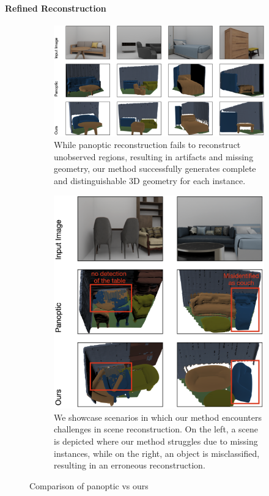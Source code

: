 \paragraph{Refined Reconstruction}

\begin{figure}%
  \begin{subfigure}[t]{109mm}
    \includegraphics[width=\linewidth]{images/image1.png}
    \caption{While panoptic reconstruction fails to reconstruct unobserved regions, resulting in artifacts and missing geometry, our method successfully generates complete and distinguishable 3D geometry for each instance.}\label{fig:comparison_good}
  \end{subfigure}
  \qquad
  \begin{subfigure}[t]{56mm}
    \includegraphics[width=\linewidth]{images/image2.png}
    \caption{We showcase scenarios in which our method encounters challenges in scene reconstruction. On the left, a scene is depicted where our method struggles due to missing instances, while on the right, an object is misclassified, resulting in an erroneous reconstruction.}\label{fig:comparison_bad}
  \end{subfigure}
  \caption{Comparison of panoptic vs ours}
  \label{fig:comparison_all}
\end{figure}

